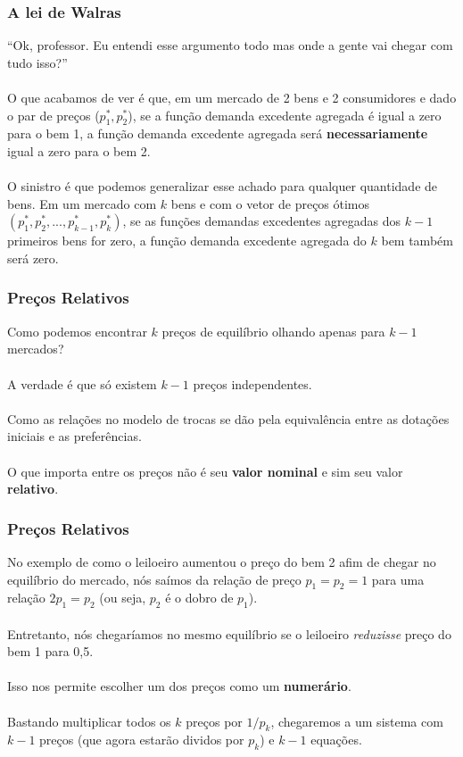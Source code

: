 \documentclass{beamer}[10]
\begin{document}
\begin{frame}
	\frametitle{A lei de Walras}

	``Ok, professor. Eu entendi esse argumento todo mas onde a gente vai chegar com tudo isso?''
	\\~\\
	O que acabamos de ver é que, em um mercado de 2 bens e 2 consumidores e dado o par de preços ($p_1^*,p_2^*$), se a função demanda excedente agregada é igual a zero para o bem 1, a função demanda excedente agregada será \textbf{necessariamente} igual a zero para o bem 2.
	\\~\\
	O sinistro é que podemos generalizar esse achado para qualquer quantidade de bens. Em um mercado com $k$ bens e com o vetor de preços ótimos $(p_1^*,p_2^*,...,p_{k-1}^*,p_k^*)$, se as funções demandas excedentes agregadas dos $k-1$ primeiros bens for zero, a função demanda excedente agregada do $k$ bem também será zero.

\end{frame}

\begin{frame}
	\frametitle{Preços Relativos}

	Como podemos encontrar $k$ preços de equilíbrio olhando apenas para $k - 1$ mercados?
	\\~\\
	A verdade é que só existem $k - 1$ preços independentes.
	\\~\\
	Como as relações no modelo de trocas se dão pela equivalência entre as dotações iniciais e as preferências.
	\\~\\
	O que importa entre os preços não é seu \textbf{valor nominal} e sim seu valor \textbf{relativo}. 

\end{frame}

\begin{frame}
	\frametitle{Preços Relativos}

	No exemplo de como o leiloeiro aumentou o preço do bem 2 afim de chegar no equilíbrio do mercado, nós saímos da relação de preço $p_1 = p_2 = 1$ para uma relação $2p_1 = p_2$ (ou seja, $p_2$ é o dobro de $p_1$).
	\\~\\
	Entretanto, nós chegaríamos no mesmo equilíbrio se o leiloeiro \textit{reduzisse} preço do bem 1 para 0,5.
	\\~\\
	Isso nos permite escolher um dos preços como um \textbf{numerário}.
	\\~\\
	Bastando multiplicar todos os $k$ preços por $1/p_k$, chegaremos a um sistema com $k - 1$ preços (que agora estarão dividos por $p_k$) e $k - 1$ equações.

\end{frame}
\end{document}
